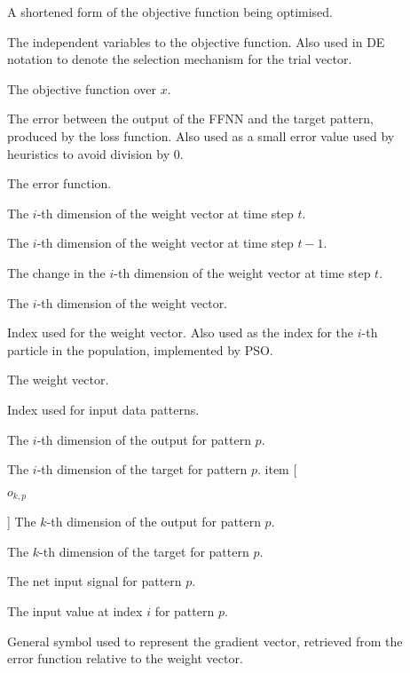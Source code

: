 \begin{description}
	\item [\parbox{2cm}{$f$}] A shortened form of the objective function being optimised.
	\item [\parbox{2cm}{$x$}] The independent variables to the objective function. Also used in \acs{DE} notation to denote the selection mechanism for the trial vector.
	\item [\parbox{2cm}{$f(x)$}] The objective function over $x$.
	\item [\parbox{2cm}{$\epsilon$}] The error between the output of the \acs{FFNN} and the target pattern, produced by the loss function. Also used as a small error value used by heuristics to avoid division by 0.
	\item [\parbox{2cm}{$\mathcal{E}$}] The error function.
	\item [\parbox{2cm}{$w_{i}(t)$}] The $i$-th dimension of the weight vector at time step $t$.
	\item [\parbox{2cm}{$w_{i}(t-1)$}] The $i$-th dimension of the weight vector at time step $t-1$.
	\item [\parbox{2cm}{$\Delta w_{i}(t)$}] The change in the $i$-th dimension of the weight vector at time step $t$.
	\item [\parbox{2cm}{$w_{i}$}] The $i$-th dimension of the weight vector.
	\item [\parbox{2cm}{$i$}] Index used for the weight vector. Also used as the index for the $i$-th particle in the population, implemented by \acs{PSO}.
	\item [\parbox{2cm}{$\boldsymbol{w}$}] The weight vector.
	\item [\parbox{2cm}{$p$}] Index used for input data patterns.
	\item [\parbox{2cm}{$o_{i,p}$}] The $i$-th dimension of the output for pattern $p$.
	\item [\parbox{2cm}{$t_{i,p}$}] The $i$-th dimension of the target for pattern $p$.
	      item [\parbox{2cm}{$o_{k,p}$}] The $k$-th dimension of the output for pattern $p$.
	\item [\parbox{2cm}{$t_{k,p}$}] The $k$-th dimension of the target for pattern $p$.
	\item [\parbox{2cm}{$net_{p}$}] The net input signal for pattern $p$.
	\item [\parbox{2cm}{$z_{i,p}$}] The input value at index $i$ for pattern $p$.
	\item [\parbox{2cm}{$\boldsymbol{g}$}] General symbol used to represent the gradient vector, retrieved from the error function relative to the weight vector.

\end{description}

